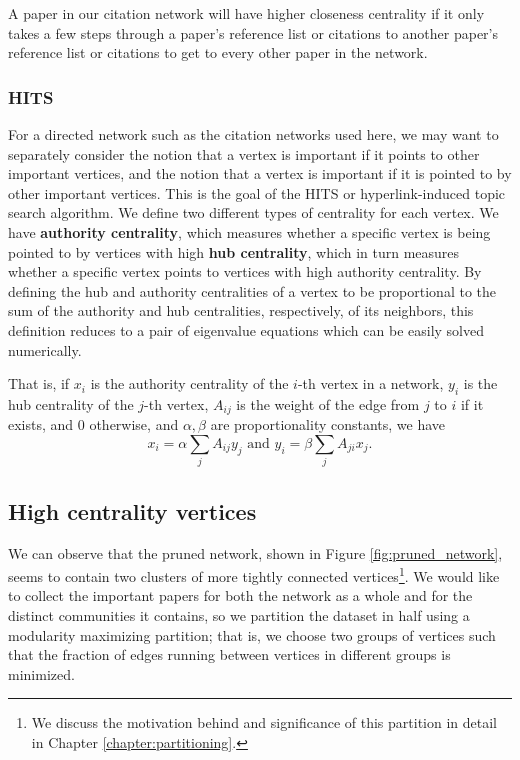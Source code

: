 \documentclass[12pt]{thesis}
\theoremstyle{plain}
\theoremstyle{definition}
\theoremstyle{remark}
\begin{document}
A paper in our citation network will have higher closeness centrality if it only takes a few steps through a paper's reference list or citations to another paper's reference list or citations to get to every other paper in the network. 

\subsubsection{HITS}
For a directed network such as the citation networks used here, we may want to separately consider the notion that a vertex is important if it points to other important vertices, and the notion that a vertex is important if it is pointed to by other important vertices. This is the goal of the HITS or hyperlink-induced topic search algorithm.  We define two different types of centrality for each vertex. We have \textbf{authority centrality}, which measures whether a specific vertex is being pointed to by vertices with high \textbf{hub centrality}, which in turn measures whether a  specific vertex points to vertices with high authority centrality. By defining the hub and authority centralities of a vertex to be proportional to the sum of the authority and hub centralities, respectively, of its neighbors, this definition reduces to a pair of eigenvalue equations which can be easily solved numerically. 

That is, if $x_i$ is the authority centrality of the $i$-th vertex in a network, $y_i$ is the hub centrality of the $j$-th vertex, $A_{ij}$ is the weight of the edge from $j$ to $i$ if it exists, and 0 otherwise, and $\alpha, \beta$ are proportionality constants, we have
\[x_i = \alpha \sum_j A_{ij}y_j\text{ and } y_i = \beta \sum_j A_{ji}x_j.\]

\subsection{High centrality vertices}\label{section:high_centrality_vertices}

We can observe that the pruned network, shown in Figure \ref{fig:pruned_network}, seems to contain two clusters of more tightly connected vertices\footnote{We discuss the motivation behind and significance of this partition in detail in Chapter \ref{chapter:partitioning}.}. We would like to collect the important papers for both the network as a whole and for the distinct communities it contains, so we partition the dataset in half using a modularity maximizing partition; that is, we choose two groups of vertices such that the fraction of edges running between vertices in different groups is minimized.
\end{document}
